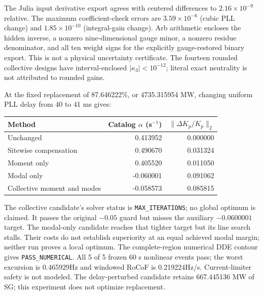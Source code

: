 
The Julia input derivative export agrees with centered differences to
$2.16\times10^{-9}$ relative.
The maximum coefficient-check errors are
$3.59\times10^{-6}$ (cubic PLL change)
and $1.85\times10^{-10}$ (integral-gain change).
Arb arithmetic encloses the hidden inverse, a nonzero nine-dimensional gauge
minor, a nonzero residue denominator, and all ten weight signs for the explicitly
gauge-restored binary export. This is not a physical uncertainty certificate.
The fourteen rounded collective designs have interval-enclosed
$|\kappa_3|<10^{-12}$; literal exact neutrality is not attributed to rounded gains.

At the fixed replacement of 87.646222\%, or
4735.315954 MW, changing uniform PLL delay from 40 to 41 ms gives:
\begin{center}
\begin{tabular}{lrr}
\toprule Method & Catalog $\alpha$ (s$^{-1}$) & $\|\Delta K_p/K_p\|_2$\\
\midrule
Unchanged & 0.413952 & 0.000000\\
Sitewise compensation & 0.490670 & 0.031324\\
Moment only & 0.405520 & 0.011050\\
Modal only & -0.060001 & 0.091062\\
Collective moment and modes & -0.058573 & 0.085815\\
\bottomrule
\end{tabular}
\end{center}
The collective candidate's solver status is
\texttt{MAX\_ITERATIONS}; no global optimum is claimed.
It passes the original $-0.05$ guard but misses the auxiliary $-0.0600001$
target. The modal-only candidate reaches that tighter target but its line
search stalls. Their costs do not establish superiority at an equal achieved
modal margin; neither run proves a local optimum.
The complete-region numerical DDE contour gives
\texttt{PASS\_NUMERICAL}.
All 5 of 5 frozen 60 s nonlinear events pass; the
worst excursion is 0.465929Hz and windowed RoCoF is
0.219224Hz/s. Current-limiter safety is not modeled.
The delay-perturbed candidate retains 667.445136 MW of SG;
this experiment does not optimize replacement.


